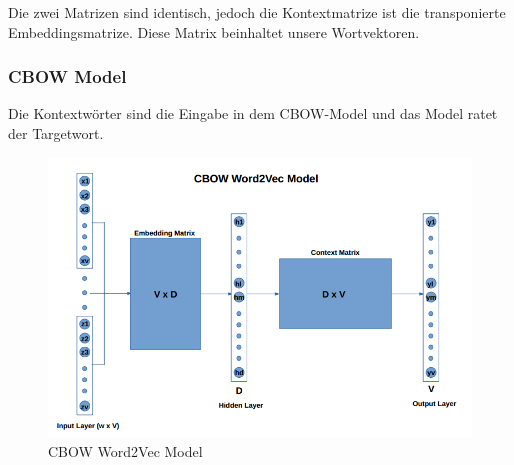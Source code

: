 Die zwei Matrizen sind identisch, jedoch die Kontextmatrize ist die transponierte Embeddingsmatrize. Diese Matrix beinhaltet unsere Wortvektoren.


\subsubsection{CBOW Model}
Die Kontextwörter sind die Eingabe in dem CBOW-Model und das Model ratet der Targetwort.

\begin{figure}
	\centering
	\includegraphics[scale=0.5]{images/CBOW_Model.png}
	\caption{CBOW Word2Vec Model}
	\label{cbow}
\end{figure}